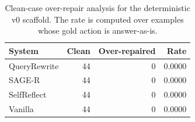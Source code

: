 \begin{table}[t]
\centering
\scriptsize
\setlength{\tabcolsep}{3pt}
\begin{tabular}{lrrr}
\toprule
System & Clean & Over-repaired & Rate \\
\midrule
QueryRewrite & 44 & 0 & 0.0000 \\
SAGE-R & 44 & 0 & 0.0000 \\
SelfReflect & 44 & 0 & 0.0000 \\
Vanilla & 44 & 0 & 0.0000 \\
\bottomrule
\end{tabular}
\caption{Clean-case over-repair analysis for the deterministic v0 scaffold. The rate is computed over examples whose gold action is answer-as-is.}
\label{tab:v0-over-repair}
\end{table}
